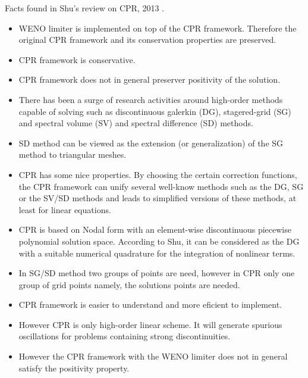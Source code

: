 \begin{frame}[allowframebreaks]
 Facts found in Shu's review on CPR, 2013 \cite{DuShu&Zhang2013}.
 \begin{itemize}
  \item WENO limiter is implemented on top of the CPR framework. Therefore the original CPR framework and its conservation properties are preserved.  
  \item CPR framework is conservative.
  \item CPR framework does not in general preserver positivity of the solution.
  \item There has been a surge of research activities around high-order methods capable of solving such as discontinuous galerkin (DG), stagered-grid (SG) and spectral volume (SV) and spectral difference (SD) methods.
  \item SD method can be viewed as the extension (or generalization) of the SG method to triangular meshes.
  \item CPR has some nice properties. By choosing the certain correction functions, the CPR framework can unify several well-know methods such as the DG, SG or the SV/SD methods and leads to simplified versions of these methods, at least for linear equations.
  \item CPR is based on Nodal form with an element-wise discontinuous piecewise polynomial solution space. According to Shu, it can be considered as the DG with a suitable numerical quadrature for the integration of nonlinear terms.
  \item In SG/SD method two groups of points are need, however in CPR only one group of grid points namely, the solutions points are needed.
  \item CPR framework is easier to understand and more eficient to implement.
  \item However CPR is only high-order linear scheme. It will generate spurious oscillations for problems containing strong discontinuities.
  \item However the CPR framework with the WENO limiter does not in general satisfy the positivity property.
 \end{itemize}
\end{frame}